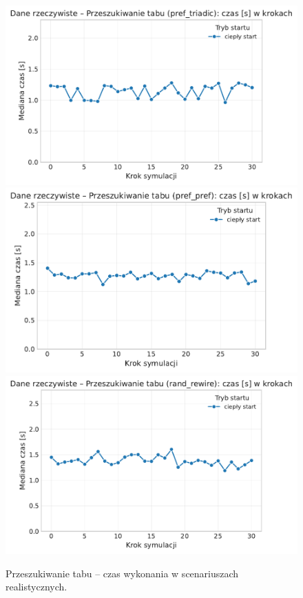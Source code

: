 \begin{figure}[H]
  \centering
  \includegraphics[width=0.62\linewidth]{assets/figures/dynamic/real/real_przeszukiwanie_tabu_time_over_steps_pref_triadic.pdf}\\[0.4em]
  \includegraphics[width=0.62\linewidth]{assets/figures/dynamic/real/real_przeszukiwanie_tabu_time_over_steps_pref_pref.pdf}\\[0.4em]
  \includegraphics[width=0.62\linewidth]{assets/figures/dynamic/real/real_przeszukiwanie_tabu_time_over_steps_rand_rewire.pdf}
  \caption{Przeszukiwanie tabu -- czas wykonania w scenariuszach realistycznych.}
  \label{fig:dyn-real-tabu-time}
\end{figure}

